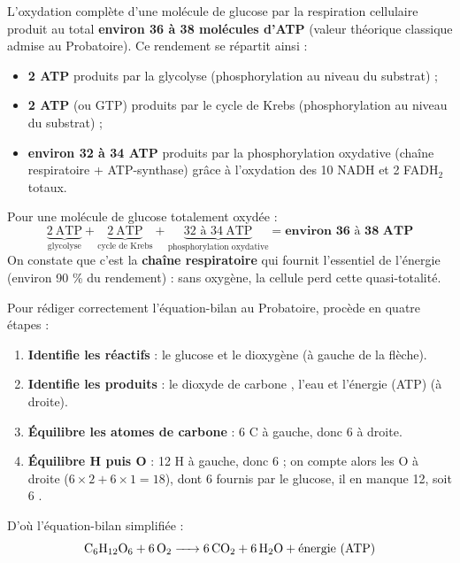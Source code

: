 \documentclass[11pt]{article}
\begin{document}
\begin{propriete}
L'oxydation complète d'une molécule de glucose par la respiration cellulaire produit au total \textbf{environ 36 à 38 molécules d'ATP} (valeur théorique classique admise au Probatoire). Ce rendement se répartit ainsi :
\begin{itemize}
\item \textbf{2 ATP} produits par la glycolyse (phosphorylation au niveau du substrat) ;
\item \textbf{2 ATP} (ou GTP) produits par le cycle de Krebs (phosphorylation au niveau du substrat) ;
\item \textbf{environ 32 à 34 ATP} produits par la phosphorylation oxydative (chaîne respiratoire + ATP-synthase) grâce à l'oxydation des 10 NADH et 2 FADH$_2$ totaux.
\end{itemize}
\end{propriete}

\begin{exemplebox}
Pour une molécule de glucose totalement oxydée :
\[ \underbrace{2\ \text{ATP}}_{\text{glycolyse}} + \underbrace{2\ \text{ATP}}_{\text{cycle de Krebs}} + \underbrace{32 \text{ à } 34\ \text{ATP}}_{\text{phosphorylation oxydative}} = \textbf{environ 36 à 38 ATP} \]
On constate que c'est la \textbf{chaîne respiratoire} qui fournit l'essentiel de l'énergie (environ 90 \% du rendement) : sans oxygène, la cellule perd cette quasi-totalité.
\end{exemplebox}

\begin{methode}
Pour rédiger correctement l'équation-bilan au Probatoire, procède en quatre étapes :
\begin{enumerate}
\item \textbf{Identifie les réactifs} : le glucose  et le dioxygène  (à gauche de la flèche).
\item \textbf{Identifie les produits} : le dioxyde de carbone , l'eau  et l'énergie (ATP) (à droite).
\item \textbf{Équilibre les atomes de carbone} : 6 C à gauche, donc 6  à droite.
\item \textbf{Équilibre H puis O} : 12 H à gauche, donc 6  ; on compte alors les O à droite ($6\times2 + 6\times1 = 18$), dont 6 fournis par le glucose, il en manque 12, soit 6 .
\end{enumerate}
D'où l'équation-bilan simplifiée :
\[ \ce{C6H12O6 + 6O2 -> 6CO2 + 6H2O} + \text{énergie (ATP)} \]
\end{methode}
\end{document}
